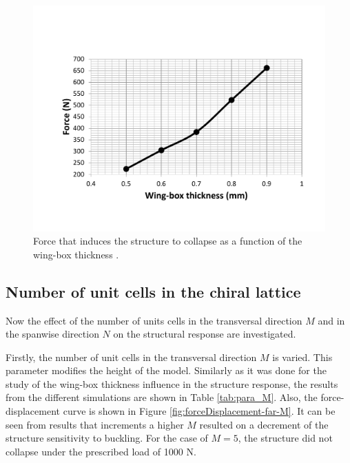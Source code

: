     \begin{figure}[!htpb] %
      \centering
      \includegraphics[width=0.8 \textwidth]{../figures/result-sim/cbox/force_cbox_t}
      \caption[Force that induces the structure to collapse as a function of the wing-box thickness]{Force that induces the structure to collapse as a function of the wing-box thickness \boxt.}\label{fig:force_cbox_t}
    \end{figure}

  \clearpage
  \subsection{Number of unit cells in the chiral lattice} \label{subsec:MandN_para}

    Now the effect of the number of units cells in the transversal direction $M$ and in the spanwise direction $N$ on the structural response are investigated.

    Firstly, the number of unit cells in the transversal direction $M$ is varied. This parameter modifies the height of the model. Similarly as it was done for the study of the wing-box thickness \boxt influence in the structure response, the results from the different simulations are shown in Table \ref{tab:para_M}. Also, the force-displacement curve is shown in Figure \ref{fig:forceDisplacement-far-M}. It can be seen from results that increments a higher $M$ resulted on a decrement of the structure sensitivity to buckling. For the case of $M = 5$, the structure did not collapse under the prescribed load of 1000 N.

